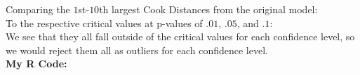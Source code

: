 \documentclass[11pt]{article}
\theoremstyle{definition}
\begin{document}
\begin{itemize}
\begin{itemize}
\begin{itemize}
\begin{center}
                        \end{center}
                        Comparing the $1$st-$10$th largest Cook Distances from the original model:\\ 
                         
                        To the respective critical values at p-values of $.01$, $.05$, and $.1$: \\
                         
                        We see that they all fall outside of the critical values for each confidence level, so we would reject them all as outliers for each confidence level. \\
                        {\bf My R Code:}
                         


\end{itemize}
\end{itemize}
\end{itemize}
\end{document}
